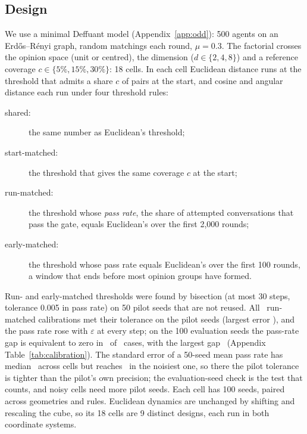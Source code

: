 \documentclass[11pt]{article}
\begin{document}
\subsection{Design}
We use a minimal Deffuant model (Appendix~\ref{app:odd}): 500 agents on an Erd\H{o}s--R\'enyi graph, random matchings each round, $\mu = 0.3$.
The factorial crosses the opinion space (unit or centred), the dimension ($d \in \{2,4,8\}$) and a reference coverage $c \in \{5\%, 15\%, 30\%\}$: 18 cells.
In each cell Euclidean distance runs at the threshold that admits a share $c$ of pairs at the start, and cosine and angular distance each run under four threshold rules:
\begin{description}
\item[shared:] the same number as Euclidean's threshold;
\item[start-matched:] the threshold that gives the same coverage $c$ at the start;
\item[run-matched:] the threshold whose \emph{pass rate}, the share of attempted conversations that pass the gate, equals Euclidean's over the first 2{,}000 rounds;
\item[early-matched:] the threshold whose pass rate equals Euclidean's over the first 100 rounds, a window that ends before most opinion groups have formed.
\end{description}
Run- and early-matched thresholds were found by bisection (at most 30 steps, tolerance 0.005 in pass rate) on 50 pilot seeds that are not reused.
All \VCalTotal\ run-matched calibrations met their tolerance on the pilot seeds (largest error \VCalMaxErr), and the pass rate rose with $\varepsilon$ at every step; on the 100 evaluation seeds the pass-rate gap is equivalent to zero in \VCalEvalEquiv\ of \VCalTotal\ cases, with the largest gap \VCalEvalMax\ (Appendix Table~\ref{tab:calibration}).
The standard error of a 50-seed mean pass rate has median \VPilotSEMed\ across cells but reaches \VPilotSEMax\ in the noisiest one, so there the pilot tolerance is tighter than the pilot's own precision; the evaluation-seed check is the test that counts, and noisy cells need more pilot seeds.
Each cell has 100 seeds, paired across geometries and rules.
Euclidean dynamics are unchanged by shifting and rescaling the cube, so its 18 cells are 9 distinct designs, each run in both coordinate systems.
\end{document}
